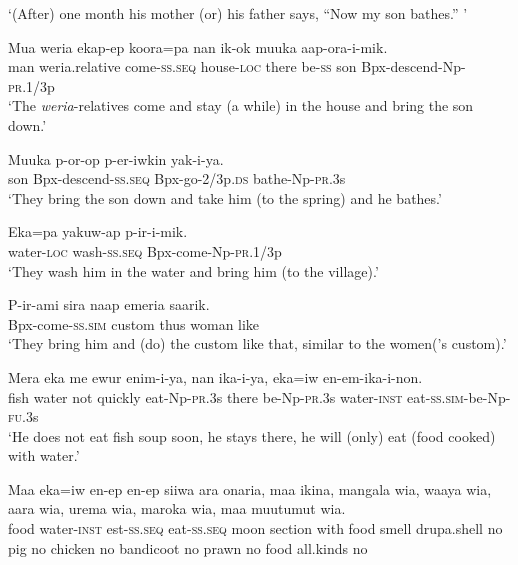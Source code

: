 \glt ‘(After) one month his mother (or) his father says, “Now my son bathes.” ’ \\
\z


\ea
\gll  Mua  weria  ekap-ep  koora=pa  nan  ik-ok  muuka         aap-ora-i-mik. \\
man  weria.relative  come-\textsc{ss.seq}  house-\textsc{loc}  there  be-\textsc{ss}  son Bpx-descend-Np-\textsc{pr}.1/3p \\


\glt ‘The \textit{weria}{}-relatives come and stay (a while) in the house and bring the son down.’ \\
\z


\ea
\gll  Muuka  p-or-op  p-er-iwkin  yak-i-ya. \\
son  Bpx-descend-\textsc{ss.seq}  Bpx-go-2/3p.\textsc{ds}  bathe-Np-\textsc{pr}.3s \\
\glt ‘They bring the son down and take him (to the spring) and he bathes.’ \\
\z


\ea
\gll  Eka=pa  yakuw-ap  p-ir-i-mik. \\
water-\textsc{loc}  wash-\textsc{ss.seq}  Bpx-come-Np-\textsc{pr}.1/3p \\
\glt ‘They wash him in the water and bring him (to the village).’ \\
\z


\ea
\gll  P-ir-ami  sira  naap  emeria  saarik. \\
Bpx-come-\textsc{ss}.\textsc{sim}  custom  thus  woman  like \\
\glt ‘They bring him and (do) the custom like that, similar to the women(’s custom).’ \\
\z


\ea
\gll  Mera  eka  me  ewur  enim-i-ya,  nan  ika-i-ya,  eka=iw           en-em-ika-i-non. \\
fish  water  not  quickly  eat-Np-\textsc{pr}.3s  there  be-Np-\textsc{pr}.3s  water-\textsc{inst} eat-\textsc{ss}.\textsc{sim}-be-Np-\textsc{fu}.3s \\


\glt ‘He does not eat fish soup soon, he stays there, he will (only) eat (food cooked) with water.’ \\
\z


\ea
\gll  Maa  eka=iw  en-ep  en-ep  siiwa  ara  onaria,  maa  ikina,          mangala  wia,  waaya  wia,  aara  wia,  urema  wia,  maroka  wia, maa  muutumut  wia. \\
food  water-\textsc{inst}  est-\textsc{ss.seq}  eat-\textsc{ss.seq}  moon  section  with  food  smell drupa.shell  no  pig  no  chicken  no  bandicoot  no  prawn  no   food  all.kinds  no \\




